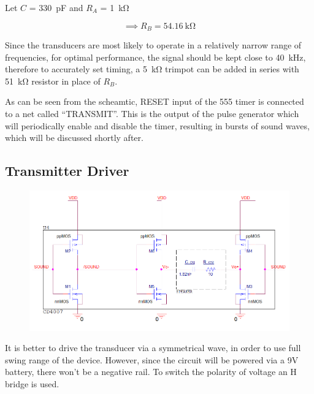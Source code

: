 \documentclass[12pt, a4paper]{article}
\begin{document}
            \noindent Let $C$ = \SI{330}{\pico\farad} and $R_A$ = \SI{1}{\kilo\ohm}

            \begin{equation}
                \implies R_B = \SI{54.16}{\kilo\ohm} 
            \end{equation}

            \noindent Since the transducers are most likely to operate in a relatively narrow range of frequencies, for optimal performance, the signal should be kept close to \SI{40}{\kilo\hertz}, therefore to accurately set timing, a \SI{5}{\kilo\ohm} trimpot can be added in series with \SI{51}{\kilo\ohm} resistor in place of $R_B$.

            As can be seen from the scheamtic, RESET input of the 555 timer is connected to a net called ``TRANSMIT''. This is the output of the pulse generator which will periodically enable and disable the timer, resulting in bursts of sound waves, which will be discussed shortly after.

        

        \subsection{Transmitter Driver}

            \begin{figure}[H]\centering
                \includegraphics[width = \textwidth]{schematics/driver.png}
                \caption[]{}
            \end{figure}
            
            It is better to drive the transducer via a symmetrical wave, in order to use full swing range of the device. However, since the circuit will be powered via a 9V battery, there won’t be a negative rail. To switch the polarity of voltage an H bridge is used. 
            
\end{document}
